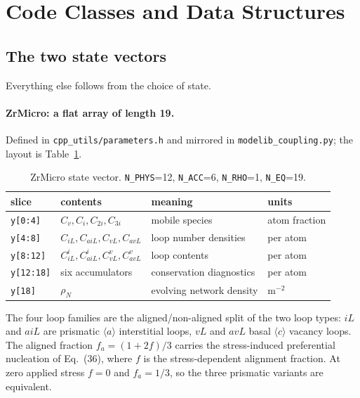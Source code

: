 \documentclass[11pt]{article}
\newcommand{\aloop}{\ensuremath{\langle a\rangle}}
\newcommand{\cloop}{\ensuremath{\langle c\rangle}}
\newcommand{\ZrM}{\textsf{ZrMicro}}
\newcommand{\code}[1]{\texttt{\small #1}}
\newcommand{\file}[1]{\texttt{\footnotesize #1}}
\newcommand{\dref}[1]{Eq.~(#1)}
\begin{document}
\section{Code Classes and Data Structures}
\label{sec:classes}

\subsection{The two state vectors}

Everything else follows from the choice of state.

\paragraph*{\ZrM{}: a flat array of length 19.}
Defined in \file{cpp\_utils/parameters.h} and mirrored in
\file{modelib\_coupling.py}; the layout is Table~\ref{tab:state0d}.

\begin{table}[htbp]
\centering
\caption{\ZrM{} state vector. \code{N\_PHYS}=12, \code{N\_ACC}=6,
\code{N\_RHO}=1, \code{N\_EQ}=19.}
\label{tab:state0d}
\begin{tabular}{@{}llll@{}}
\toprule
slice & contents & meaning & units \\
\midrule
\code{y[0:4]}   & $C_v, C_i, C_{2i}, C_{3i}$ & mobile species & atom fraction \\
\code{y[4:8]}   & $C_{iL}, C_{aiL}, C_{vL}, C_{avL}$ & loop number densities & per atom \\
\code{y[8:12]}  & $C_{iL}^{i}, C_{aiL}^{i}, C_{vL}^{v}, C_{avL}^{v}$ & loop contents & per atom \\
\code{y[12:18]} & six accumulators & conservation diagnostics & per atom \\
\code{y[18]}    & $\rho_N$ & evolving network density & m$^{-2}$ \\
\bottomrule
\end{tabular}
\end{table}

\noindent
The four loop families are the aligned/non-aligned split of the two loop types:
$iL$ and $aiL$ are prismatic \aloop{} interstitial loops, $vL$ and $avL$ basal
\cloop{} vacancy loops. The aligned fraction $f_a = (1+2f)/3$ carries the
stress-induced preferential nucleation of \dref{36}, where $f$ is the
stress-dependent alignment fraction. At zero applied stress $f=0$ and
$f_a = 1/3$, so the three prismatic variants are equivalent.
\end{document}
